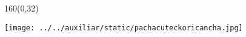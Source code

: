 \documentclass[shownotes,aspectratio=169]{beamer}
\begin{document}
\begin{frame}[plain]
\begin{textblock}{160}(0,32)
\centering
{}
\end{textblock}

\end{frame}



 
\begin{frame}[plain]
\centering
  \texttt{[image: ../../auxiliar/static/pachacuteckoricancha.jpg]}
\end{frame}
\end{document}
